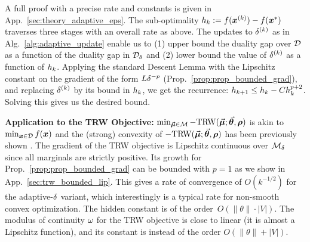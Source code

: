 A full proof with a precise rate and constants is given in App.~\ref{sec:theory_adaptive_eps}.
The sub-optimality $h_k := f(\bm{x}^{(k)})-f(\bm{x}^{*})$ traverses three stages with an overall rate as above. 
%
%
The updates to $\delta^{(k)}$ as in Alg.~\ref{alg:adaptive_update} 
enable us to (1) upper bound the duality gap over $\mathcal{D}$ as a function of the duality gap in $\mathcal{D}_{\delta}$ 
and (2) lower bound the value
of $\delta^{(k)}$ as a function of $h_k$. Applying the standard Descent Lemma with the Lipschitz constant on the gradient of the form $L\delta^{-p}$ (Prop.~\ref{prop:prop_bounded_grad}), and replacing $\delta^{(k)}$ by its bound in $h_k$, we get the recurrence: $h_{k+1} \leq h_k - C h_k^{p+2}$. Solving this gives us the desired bound.

%
\textbf{Application to the TRW Objective: }
$\min_{\vec{\bm{\mu}}\in\mathcal{M}}-\text{TRW}(\vec{\bm{\mu}};\vec{\bm{\theta}},\bm{\rho})$ is akin to $\min_{\bm{x}\in\mathcal{D}}f(\bm{x})$ and the
(strong) convexity of $-\text{TRW}(\vec{\bm{\mu}};\vec{\bm{\theta}},\bm{\rho})$ has been previously shown \citep{wainwright2005new,london_icml15}.
The gradient of the TRW objective is Lipschitz continuous over $\mathcal{M}_{\delta}$
since all marginals are strictly positive. Its growth for
Prop.~\ref{prop:prop_bounded_grad} can be bounded with $p=1$ as we
show in App.~\ref{sec:trw_bounded_lip}. This gives a rate of
convergence of $O(k^{-1/2})$ for the adaptive-$\delta$ variant,
which interestingly is a typical rate for non-smooth convex optimization. The hidden constant is of the order~$O(\| \theta \| \cdot |V|)$. The modulus of continuity $\omega$ for the TRW objective is close to linear (it is almost a Lipschitz function), and its constant is instead of the order $O(\| \theta \| + |V|)$.

%
%
%
%
%
%
%

%
%
%


